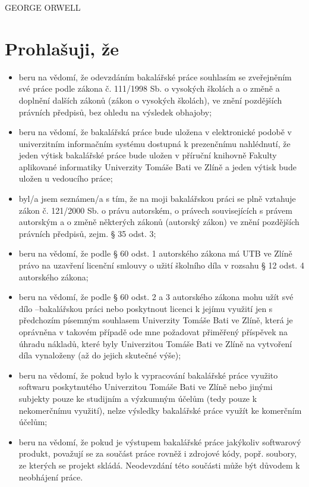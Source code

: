 \documentclass[a4paper,12pt]{article}
\newcommand{\nmm}[1]{\section*{#1}} %
\begin{document}
\hspace{9cm}GEORGE ORWELL
\clearpage
\thispagestyle{empty}
\clearpage
\nmm{Prohlašuji, že}
\begin{itemize}\fontsize{10}{1}
\normalsize
\item beru na vědomí, že odevzdáním bakalářské práce souhlasím se zveřejněním své práce podle zákona č. 111/1998 Sb. o vysokých školách a o změně a doplnění dalších zákonů (zákon o vysokých školách), ve znění pozdějších právních předpisů, bez ohledu na výsledek obhajoby;
\item beru na vědomí, že bakalářská práce bude uložena v elektronické podobě v univerzitním informačním systému dostupná k prezenčnímu nahlédnutí, že jeden výtisk bakalářské práce bude uložen v příruční knihovně Fakulty aplikované informatiky Univerzity Tomáše Bati ve Zlíně a jeden výtisk bude uložen u vedoucího práce; 
\item byl/a jsem seznámen/a s tím, že na moji bakalářskou práci se plně vztahuje zákon č. 121/2000 Sb. o právu autorském, o právech souvisejících s právem autorským a o změně některých zákonů (autorský zákon) ve znění pozdějších právních předpisů, zejm. § 35 odst. 3;
\item beru na vědomí, že podle § 60 odst. 1 autorského zákona má UTB ve Zlíně právo na uzavření licenční smlouvy o užití školního díla v rozsahu § 12 odst. 4 autorského zákona;
\item beru na vědomí, že podle § 60 odst. 2 a 3 autorského zákona mohu užít své dílo –bakalářskou práci nebo poskytnout licenci k jejímu využití jen s předchozím písemným souhlasem Univerzity Tomáše Bati ve Zlíně, která je oprávněna v takovém případě ode mne požadovat přiměřený příspěvek na úhradu nákladů, které byly Univerzitou Tomáše Bati ve Zlíně na vytvoření díla vynaloženy (až do jejich skutečné výše);
\item beru na vědomí, že pokud bylo k vypracování bakalářské práce
využito softwaru poskytnutého Univerzitou Tomáše Bati ve Zlíně nebo jinými
subjekty pouze ke studijním a výzkumným účelům (tedy pouze k nekomerčnímu
využití), nelze výsledky bakalářské práce využít ke komerčním
účelům;
\item beru na vědomí, že pokud je výstupem bakalářské práce jakýkoliv softwarový produkt, považují se za součást práce rovněž i zdrojové kódy, popř. soubory, ze kterých se projekt skládá. Neodevzdání této součásti může být důvodem k neobhájení práce.
\end{itemize}
\end{document}

